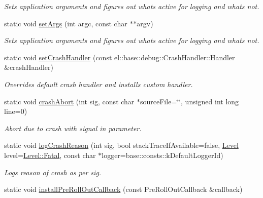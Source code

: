 \begin{DoxyCompactItemize}
\begin{DoxyCompactList}\small\item\em Sets application arguments and figures out whats active for logging and whats not. \end{DoxyCompactList}\item 
static void \hyperlink{classel_1_1Helpers_afac7a023e2c13a62d0295cf0239eb848}{set\+Args} (int argc, const char $\ast$$\ast$argv)
\begin{DoxyCompactList}\small\item\em Sets application arguments and figures out whats active for logging and whats not. \end{DoxyCompactList}\item 
static void \hyperlink{classel_1_1Helpers_a4155f6fff0074ad93aa56fd7fe064097}{set\+Crash\+Handler} (const el\+::base\+::debug\+::\+Crash\+Handler\+::\+Handler \&crash\+Handler)
\begin{DoxyCompactList}\small\item\em Overrides default crash handler and installs custom handler. \end{DoxyCompactList}\item 
static void \hyperlink{classel_1_1Helpers_a6e16f0e07ce40e0659fcfec4ea5b6fe1}{crash\+Abort} (int sig, const char $\ast$source\+File=\char`\"{}\char`\"{}, unsigned int long line=0)
\begin{DoxyCompactList}\small\item\em Abort due to crash with signal in parameter. \end{DoxyCompactList}\item 
static void \hyperlink{classel_1_1Helpers_abf1ae61428740e1e6c5d5f0c36500faa}{log\+Crash\+Reason} (int sig, bool stack\+Trace\+If\+Available=false, \hyperlink{namespaceel_ab0ac6091262344c52dd2d3ad099e8e36}{Level} level=\hyperlink{namespaceel_ab0ac6091262344c52dd2d3ad099e8e36a882384ec38ce8d9582b57e70861730e4}{Level\+::\+Fatal}, const char $\ast$logger=base\+::consts\+::k\+Default\+Logger\+Id)
\begin{DoxyCompactList}\small\item\em Logs reason of crash as per sig. \end{DoxyCompactList}\item 
static void \hyperlink{classel_1_1Helpers_a5fd7ad6d636c28d2e706203d0c43cf8c}{install\+Pre\+Roll\+Out\+Callback} (const Pre\+Roll\+Out\+Callback \&callback)\hypertarget{classel_1_1Helpers_a5fd7ad6d636c28d2e706203d0c43cf8c}{}\label{classel_1_1Helpers_a5fd7ad6d636c28d2e706203d0c43cf8c}


\end{DoxyCompactItemize}
